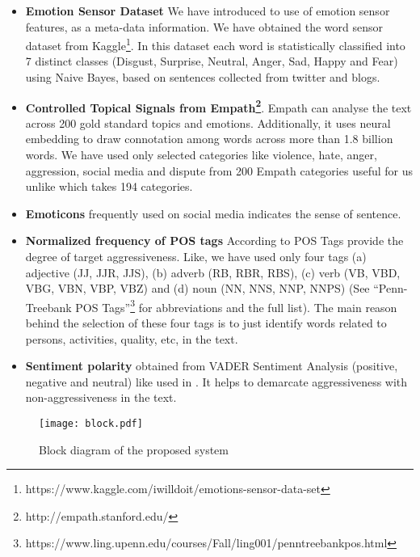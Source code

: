 \documentclass[sigconf]{acmart}
\begin{document}
\begin{itemize}
\item \textbf{Emotion Sensor Dataset} We have introduced to use of emotion sensor features, as a meta-data information. We have obtained the word  sensor dataset from Kaggle\footnote{https://www.kaggle.com/iwilldoit/emotions-sensor-data-set}. In this dataset each word is statistically classified into 7 distinct classes (Disgust, Surprise, Neutral, Anger, Sad, Happy and Fear) using Naive Bayes, based on sentences collected from twitter and blogs.
\item \textbf{Controlled Topical Signals from Empath\footnote{http://empath.stanford.edu/}}. Empath can analyse the text across 200 gold standard topics and emotions. Additionally, it uses neural embedding to draw connotation among words across more than 1.8 billion words. We have used only selected categories like violence, hate, anger, aggression, social media and dispute from 200 Empath categories useful for us  unlike\cite{ramiandrisoa2018irit} which takes 194 categories. 
\item \textbf{Emoticons} frequently used on social media indicates the sense of sentence\cite{raiyani2018fully, galery2018aggression, orasan2018aggressive}.
\item \textbf{Normalized frequency of POS tags} According to \cite{ramiandrisoa2018irit, tommasel2018textual, fortuna2018merging, golem2018combining} POS Tags provide the degree of target aggressiveness. Like\cite{ramiandrisoa2018irit}, we have used only four tags (a) adjective (JJ, JJR, JJS), (b) adverb (RB, RBR, RBS), (c) verb (VB, VBD, VBG, VBN, VBP, VBZ) and (d) noun (NN, NNS, NNP, NNPS) (See \enquote{Penn-Treebank POS Tags}\footnote{https://www.ling.upenn.edu/courses/Fall/ling001/penn\textunderscore treebank\textunderscore pos.html} for abbreviations and the full list). The main reason behind the selection of these four tags is to just identify words related to persons, activities, quality, etc, in the text.
\item \textbf{Sentiment polarity} obtained from VADER Sentiment Analysis \cite{hutto2014vader} (positive, negative and neutral) like used in \cite{golem2018combining, risch2018aggression, tommasel2018textual,fortuna2018merging}. It helps to demarcate aggressiveness with non-aggressiveness in the text.
\end{itemize}
\begin{figure*}[t]
    \centering
    \texttt{[image: block.pdf]}
    \caption{Block diagram of the proposed system}
    \label{fig:block}
\end{figure*}
\end{document}
